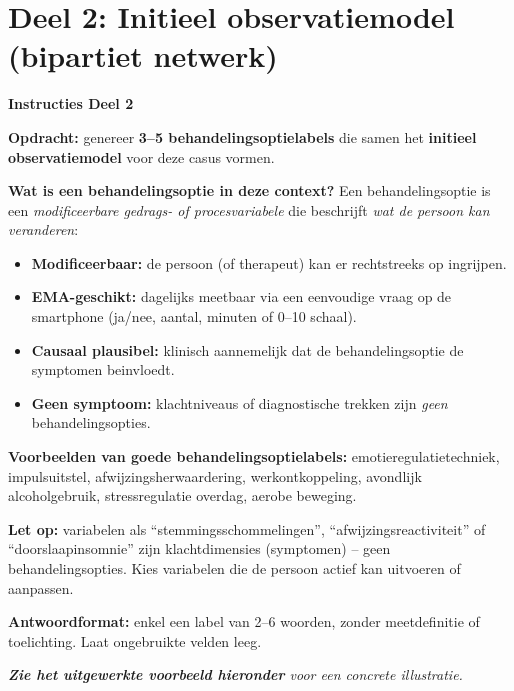 \documentclass[11pt,a4paper]{article}
\begin{document}
\vspace{0.6em}

\newpage


\section{Deel 2: Initieel observatiemodel (bipartiet netwerk)}

\begin{tcolorbox}[colback=green!3,colframe=ForestGreen,arc=2.5mm,boxrule=0.9pt,
  left=10pt,right=10pt,top=9pt,bottom=9pt]
\textbf{\color{ForestGreen}Instructies Deel 2}

\smallskip\small
\textbf{Opdracht:} genereer \textbf{3--5 behandelingsoptielabels} die samen het
\textbf{initieel observatiemodel} voor deze casus vormen.

\textbf{Wat is een behandelingsoptie in deze context?}
Een behandelingsoptie is een \emph{modificeerbare gedrags- of procesvariabele} die beschrijft
\emph{wat de persoon kan veranderen}:
\begin{itemize}[topsep=2pt,itemsep=1pt]
\item \textbf{Modificeerbaar:} de persoon (of therapeut) kan er rechtstreeks op ingrijpen.
\item \textbf{EMA-geschikt:} dagelijks meetbaar via een eenvoudige vraag op de smartphone
(ja/nee, aantal, minuten of 0--10 schaal).
\item \textbf{Causaal plausibel:} klinisch aannemelijk dat de behandelingsoptie de symptomen beinvloedt.
\item \textbf{Geen symptoom:} klachtniveaus of diagnostische trekken zijn
\emph{geen} behandelingsopties.
\end{itemize}

\textbf{Voorbeelden van goede behandelingsoptielabels:}
emotieregulatietechniek, impulsuitstel, afwijzingsherwaardering, werkontkoppeling,
avondlijk alcoholgebruik, stressregulatie overdag, aerobe beweging.

\textbf{Let op:} variabelen als ``stemmingsschommelingen'', ``afwijzingsreactiviteit'' of
``doorslaapinsomnie'' zijn klachtdimensies (symptomen) -- geen behandelingsopties. Kies
variabelen die de persoon actief kan uitvoeren of aanpassen.

\textbf{Antwoordformat:} enkel een label van 2--6 woorden, zonder meetdefinitie of toelichting.
Laat ongebruikte velden leeg.

\medskip
\textit{\textbf{Zie het uitgewerkte voorbeeld hieronder} voor een concrete illustratie.}
\end{tcolorbox}
\end{document}
